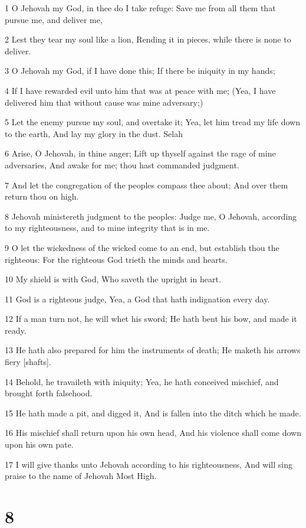 \par 1 O Jehovah my God, in thee do I take refuge: Save me from all them that pursue me, and deliver me,
\par 2 Lest they tear my soul like a lion, Rending it in pieces, while there is none to deliver.
\par 3 O Jehovah my God, if I have done this; If there be iniquity in my hands;
\par 4 If I have rewarded evil unto him that was at peace with me; (Yea, I have delivered him that without cause was mine adversary;)
\par 5 Let the enemy pursue my soul, and overtake it; Yea, let him tread my life down to the earth, And lay my glory in the dust. Selah
\par 6 Arise, O Jehovah, in thine anger; Lift up thyself against the rage of mine adversaries, And awake for me; thou hast commanded judgment.
\par 7 And let the congregation of the peoples compass thee about; And over them return thou on high.
\par 8 Jehovah ministereth judgment to the peoples: Judge me, O Jehovah, according to my righteousness, and to mine integrity that is in me.
\par 9 O let the wickedness of the wicked come to an end, but establish thou the righteous: For the righteous God trieth the minds and hearts.
\par 10 My shield is with God, Who saveth the upright in heart.
\par 11 God is a righteous judge, Yea, a God that hath indignation every day.
\par 12 If a man turn not, he will whet his sword; He hath bent his bow, and made it ready.
\par 13 He hath also prepared for him the instruments of death; He maketh his arrows fiery [shafts].
\par 14 Behold, he travaileth with iniquity; Yea, he hath conceived mischief, and brought forth falsehood.
\par 15 He hath made a pit, and digged it, And is fallen into the ditch which he made.
\par 16 His mischief shall return upon his own head, And his violence shall come down upon his own pate.
\par 17 I will give thanks unto Jehovah according to his righteousness, And will sing praise to the name of Jehovah Most High.

\chapter{8}

